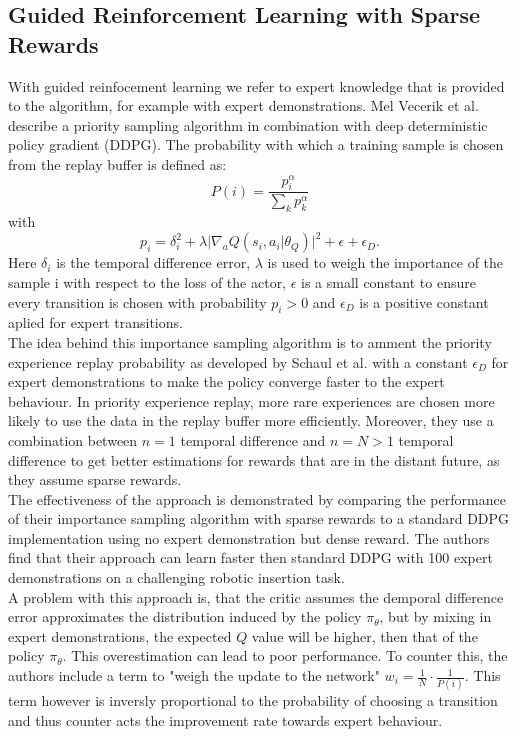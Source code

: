 \subsection{Guided Reinforcement Learning with Sparse Rewards}
With guided reinfocement learning we refer to expert knowledge that is provided to the algorithm, for example with expert demonstrations.
Mel Vecerik et al. \cite{vecerik2018leveraging} describe a priority 
sampling algorithm in combination with deep deterministic policy gradient (DDPG). The probability with which a 
training sample is chosen from the replay buffer is defined as: 
\begin{equation}
    P(i) = \frac{p_i^\alpha}{\sum\limits_{k} p_k^\alpha}
\end{equation}
with 
\begin{equation}
    p_i = \delta_{i}^2 + \lambda \lvert \nabla_a Q(s_i, a_i \vert \theta_Q) \rvert^2 + \epsilon + \epsilon_{D}.
\end{equation}
Here $\delta_{i}$ is the temporal difference error, $\lambda$ is used to weigh the importance of the sample i with respect to the loss of the actor, 
$\epsilon$ is a small constant to ensure every transition is chosen with probability $p_i > 0$ and $\epsilon_D$ is a positive constant aplied for expert transitions.\\
The idea behind this importance sampling algorithm is to amment the priority experience replay probability as developed by Schaul et al. \cite{schaul2016prioritized} 
with a constant $\epsilon_{D}$ for expert demonstrations to make the policy converge faster to the expert behaviour. In priority experience replay, more rare 
experiences are chosen more likely to use the data in the replay buffer more efficiently. Moreover, they use a combination between $n=1$ temporal difference and 
$n=N > 1$ temporal difference to get better estimations for rewards that are in the distant future, as they assume sparse rewards.\\
The effectiveness of the approach is demonstrated by comparing the performance of their importance sampling algorithm with sparse rewards to a standard DDPG 
implementation using no expert demonstration but dense reward. The authors find that their approach can learn faster then standard DDPG with 100 expert 
demonstrations on a challenging robotic insertion task.\\ 
A problem with this approach is, that the critic assumes the demporal difference error approximates the distribution induced by the policy $\pi_{\theta}$, but by 
mixing in expert demonstrations, the expected $Q$ value will be higher, then that of the policy $\pi_{\theta}$. This overestimation can lead to poor performance. 
To counter this, the authors include a term to "weigh the update to the network" $w_i = \frac{1}{N} \cdot \frac{1}{P(i)}$. This term however is inversly proportional to the 
probability of choosing a transition and thus counter acts the improvement rate towards expert behaviour. 

